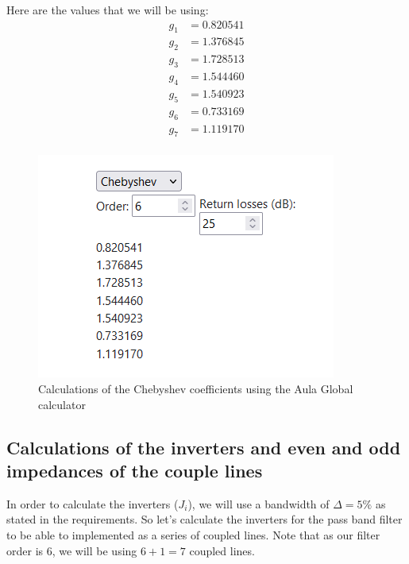 \documentclass[12pt]{report} %
\begin{document}
Here are the values that we will be using:
\begin{align*}
g_1 &= 0.820541 \\
g_2 &= 1.376845 \\
g_3 &= 1.728513 \\
g_4 &= 1.544460 \\
g_5 &= 1.540923 \\
g_6 &= 0.733169 \\
g_7 &= 1.119170 \\
\end{align*}

\begin{figure}
    \centering
    \includegraphics[width=1\linewidth]{images//design_circuit_elements/chebyshev_filter_normalized_elements_calculator.png}
    \caption{Calculations of the Chebyshev coefficients using the Aula Global calculator}
    \label{fig:design_circuit_elements:chebyshev_filter_normalized_elements_calculator}
\end{figure}

\subsection{Calculations of the inverters and even and odd impedances of the couple lines}

In order to calculate the inverters ($J_i$), we will use a bandwidth of $\Delta = 5\%$ as stated in the requirements. So let's calculate the inverters for the pass band filter to be able to implemented as a series of coupled lines. Note that as our filter order is 6, we will be using $6 + 1 = 7$ coupled lines.
\end{document}
